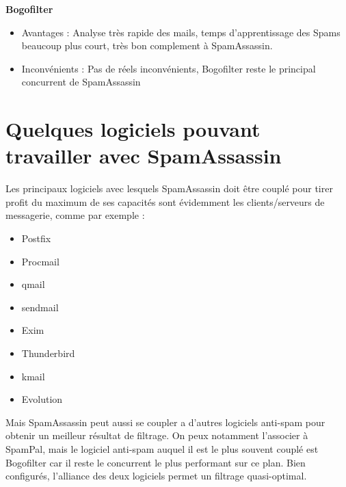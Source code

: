 \documentclass[a4paper,11pt]{article}
\begin{document}
\textbf{Bogofilter}
\begin{itemize}
\item Avantages : Analyse très rapide des mails, temps d'apprentissage des Spams beaucoup plus court, très bon complement à SpamAssassin.
\item Inconvénients : Pas de réels inconvénients, Bogofilter reste le principal concurrent de SpamAssassin
\end{itemize}

\section{Quelques logiciels pouvant travailler avec SpamAssassin}
Les principaux logiciels avec lesquels SpamAssassin doit être couplé pour tirer profit du maximum de ses capacités sont évidemment les clients/serveurs de messagerie, comme par exemple :
\begin{itemize}
\item Postfix
\item Procmail
\item qmail
\item sendmail
\item Exim
\item Thunderbird
\item kmail
\item Evolution
\end{itemize}

Mais SpamAssassin peut aussi se coupler a d'autres logiciels anti-spam pour obtenir un meilleur résultat de filtrage. On peux notamment l'associer à SpamPal, mais le logiciel anti-spam auquel il est le plus souvent couplé est Bogofilter car il reste le concurrent le plus performant sur ce plan. Bien configurés, l'alliance des deux logiciels permet un filtrage quasi-optimal.
\end{document}
